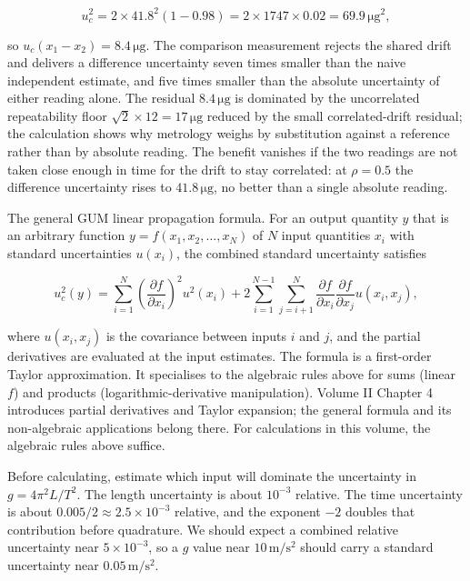 \[
u_{c}^{2} = 2 \times 41.8^{2}(1 - 0.98) = 2 \times 1747 \times 0.02
= 69.9\,\si{\micro\gram}^{2},
\]

so $u_{c}(x_{1} - x_{2}) = 8.4\,\si{\micro\gram}$. The comparison
measurement rejects the shared drift and delivers a difference
uncertainty seven times smaller than the naive independent estimate,
and five times smaller than the absolute uncertainty of either
reading alone. The residual $8.4\,\si{\micro\gram}$ is dominated by
the uncorrelated repeatability floor $\sqrt{2} \times 12 =
17\,\si{\micro\gram}$ reduced by the small correlated-drift residual;
the calculation shows why metrology weighs by substitution against a
reference rather than by absolute reading. The benefit vanishes if
the two readings are not taken close enough in time for the drift to
stay correlated: at $\rho = 0.5$ the difference uncertainty rises to
$41.8\,\si{\micro\gram}$, no better than a single absolute reading.

\begin{mastery}
The general GUM linear propagation formula. For an output quantity
$y$ that is an arbitrary function $y = f(x_{1}, x_{2}, \ldots,
x_{N})$ of $N$ input quantities $x_{i}$ with standard uncertainties
$u(x_{i})$, the combined standard uncertainty satisfies

\[
u_{c}^{2}(y) = \sum_{i=1}^{N}\left(\frac{\partial f}{\partial x_{i}}
\right)^{2} u^{2}(x_{i}) + 2\sum_{i=1}^{N-1}\sum_{j=i+1}^{N}
\frac{\partial f}{\partial x_{i}} \frac{\partial f}{\partial x_{j}}
u(x_{i}, x_{j}),
\]

where $u(x_{i}, x_{j})$ is the covariance between inputs $i$ and
$j$, and the partial derivatives are evaluated at the input
estimates. The formula is a first-order Taylor approximation. It
specialises to the algebraic rules above for sums (linear $f$) and
products (logarithmic-derivative manipulation). Volume II Chapter 4
introduces partial derivatives and Taylor expansion; the general
formula and its non-algebraic applications belong there. For
calculations in this volume, the algebraic rules above suffice.
\end{mastery}

\begin{estimation}
Before calculating, estimate which input will dominate the uncertainty
in $g = 4\pi^{2} L / T^{2}$. The length uncertainty is about $10^{-3}$
relative. The time uncertainty is about $0.005/2 \approx 2.5 \times
10^{-3}$ relative, and the exponent $-2$ doubles that contribution
before quadrature. We should expect a combined relative uncertainty
near $5 \times 10^{-3}$, so a $g$ value near $10 \,\si{\meter\per
\second\squared}$ should carry a standard uncertainty near $0.05 \,
\si{\meter\per\second\squared}$.
\end{estimation}

